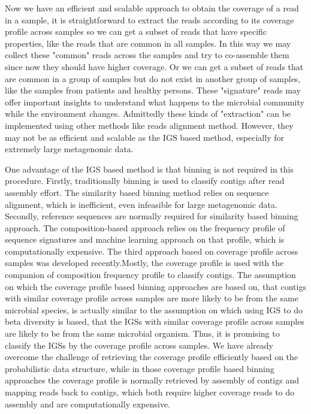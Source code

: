 \documentclass{article}
\begin{document}
Now we have an efficient and scalable approach to obtain the coverage of a read in
a sample, it is straightforward to extract the reads according to its coverage
profile across samples so we can get a subset of reads that have specific
properties, like the reads that are common in all samples. In this way we
may collect these "common" reads across the samples and try to co-assemble
them since now they should have higher coverage. Or we can get a subset of
reads that are common in a group of samples but do not exist in another group
of samples, like the samples from patients and healthy persons. These
"signature" reads may offer important insights to understand what happens
to the microbial community while the environment changes. Admittedly these
kinds of "extraction" can be implemented using other methods like reads 
alignment method. However, they may not be as efficient and scalable as the IGS
based method, especially for extremely large metagenomic data.


One advantage of the IGS based method is that binning is not required in this
procedure. Firstly, traditionally binning is used to classify contigs after read
assembly effort. The similarity based binning method relies on
sequence alignment, which is inefficient, even infeasible for large
metagenomic data. Secondly, reference sequences are normally required for
similarity based binning approach. The composition-based approach relies on the
frequency profile of sequence signatures and machine learning approach on that
profile, which is computationally expensive. 
The third approach based on coverage profile across samples was developed
recently\cite{Albertsen2013,Karlsson2013,Alneberg2014,Nielsen2014,Imelfort2014}.Mostly, the coverage
profile is used with the companion of composition frequency profile to classify
contigs. The assumption on which the coverage profile based binning approaches
are based on, that contigs with similar coverage profile across samples are
more likely to be from the same microbial species, is actually similar to the
assumption on which using IGS to do beta diversity is based, that the IGSs with
similar coverage profile across samples are likely to be from the same
microbial organism. Thus, it is promising to classify the IGSs by the coverage
profile across samples. We have already overcome the challenge of retrieving the
coverage profile efficiently based on the probabilistic data structure, while
in those coverage profile based binning approaches the coverage profile is 
normally retrieved by assembly of contigs and mapping
reads back to contigs, which both require higher coverage reads to do assembly
and are computationally expensive. 
\end{document}

